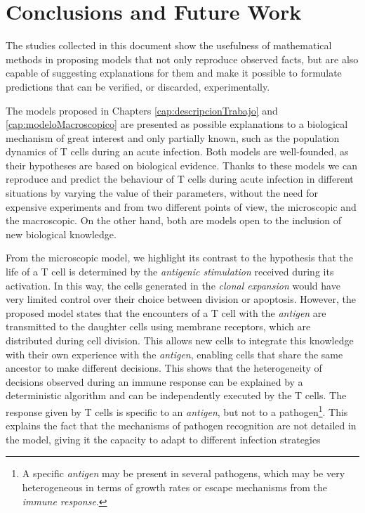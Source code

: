 \chapter{Conclusions and Future Work}
\label{cap:conclusions}

The studies collected in this document show the usefulness of mathematical methods in proposing models that not only reproduce observed facts, but are also capable of suggesting explanations for them and make it possible to formulate predictions that can be verified, or discarded, experimentally. 


The models proposed in Chapters \ref{cap:descripcionTrabajo} and \ref{cap:modeloMacroscopico} are presented as possible explanations to a biological mechanism of great interest and only partially known, such as the population dynamics of T cells during an acute infection. Both models are well-founded, as their hypotheses are based on biological evidence. Thanks to these models we can reproduce and predict the behaviour of T cells during acute infection in different situations by varying the value of their parameters, without the need for expensive experiments and from two different points of view, the microscopic and the macroscopic. On the other hand, both are models open to the inclusion of new biological knowledge. 


From the microscopic model, we highlight its contrast to the hypothesis that the life of a T cell is determined by the \textit{antigenic stimulation} received during its activation. In this way, the cells generated in the \textit{clonal expansion} would have very limited control over their choice between division or apoptosis. However, the proposed model states that the encounters of a T cell with the \textit{antigen} are transmitted to the daughter cells using membrane receptors, which are distributed during cell division. This allows new cells to integrate this knowledge with their own experience with the \textit{antigen}, enabling cells that share the same ancestor to make different decisions. This shows that the heterogeneity of decisions observed during an immune response can be explained by a deterministic algorithm and can be independently executed by the T cells. The response given by T cells is specific to an \textit{antigen}, but not to a pathogen\footnote{A specific \textit{antigen} may be present in several pathogens, which may be very heterogeneous in terms of growth rates or escape mechanisms from the \textit{immune response}.}. This explains the fact that the mechanisms of pathogen recognition are not detailed in the model, giving it the capacity to adapt to different infection strategies \citep{JTB}


